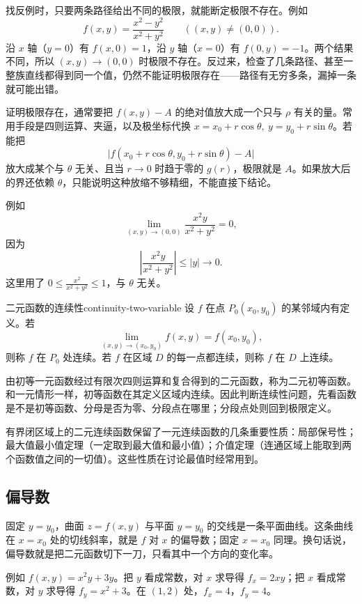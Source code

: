 找反例时，只要两条路径给出不同的极限，就能断定极限不存在。例如
\[
    f(x,y)=\frac{x^2-y^2}{x^2+y^2}\qquad((x,y)\neq(0,0)).
\]
沿 \(x\) 轴（\(y=0\)）有 \(f(x,0)=1\)，沿 \(y\) 轴（\(x=0\)）有 \(f(0,y)=-1\)。两个结果不同，所以 \((x,y)\to(0,0)\) 时极限不存在。反过来，检查了几条路径、甚至一整族直线都得到同一个值，仍然不能证明极限存在——路径有无穷多条，漏掉一条就可能出错。

证明极限存在，通常要把 \(f(x,y)-A\) 的绝对值放大成一个只与 \(\rho\) 有关的量。常用手段是四则运算、夹逼，以及极坐标代换 \(x=x_0+r\cos\theta,\ y=y_0+r\sin\theta\)。若能把
\[
    \lvert f(x_0+r\cos\theta,y_0+r\sin\theta)-A\rvert
\]
放大成某个与 \(\theta\) 无关、且当 \(r\to0\) 时趋于零的 \(g(r)\)，极限就是 \(A\)。如果放大后的界还依赖 \(\theta\)，只能说明这种放缩不够精细，不能直接下结论。

例如
\[
    \lim_{(x,y)\to(0,0)}\frac{x^2y}{x^2+y^2}=0,
\]
因为
\[
    \left\lvert\frac{x^2y}{x^2+y^2}\right\rvert
    \le \lvert y\rvert \to 0 .
\]
这里用了 \(0\le \frac{x^2}{x^2+y^2}\le1\)，与 \(\theta\) 无关。

\begin{mydef}{二元函数的连续性}{continuity-two-variable}
    设 \(f\) 在点 \(P_0(x_0,y_0)\) 的某邻域内有定义。若
    \[
        \lim_{(x,y)\to(x_0,y_0)}f(x,y)=f(x_0,y_0),
    \]
    则称 \(f\) 在 \(P_0\) 处连续。若 \(f\) 在区域 \(D\) 的每一点都连续，则称 \(f\) 在 \(D\) 上连续。
\end{mydef}

由初等一元函数经过有限次四则运算和复合得到的二元函数，称为二元初等函数。和一元情形一样，初等函数在其定义区域内连续。因此判断连续性问题，先看函数是不是初等函数、分母是否为零、分段点在哪里；分段点处则回到极限定义。

有界闭区域上的二元连续函数保留了一元连续函数的几条重要性质：局部保号性；最大值最小值定理（一定取到最大值和最小值）；介值定理（连通区域上能取到两个函数值之间的一切值）。这些性质在讨论最值时经常用到。

\subsection{偏导数}

固定 \(y=y_0\)，曲面 \(z=f(x,y)\) 与平面 \(y=y_0\) 的交线是一条平面曲线。这条曲线在 \(x=x_0\) 处的切线斜率，就是 \(f\) 对 \(x\) 的偏导数；固定 \(x=x_0\) 同理。换句话说，偏导数就是把二元函数切下一刀，只看其中一个方向的变化率。

例如 \(f(x,y)=x^2y+3y\)。把 \(y\) 看成常数，对 \(x\) 求导得 \(f_x=2xy\)；把 \(x\) 看成常数，对 \(y\) 求导得 \(f_y=x^2+3\)。在 \((1,2)\) 处，\(f_x=4\)，\(f_y=4\)。

